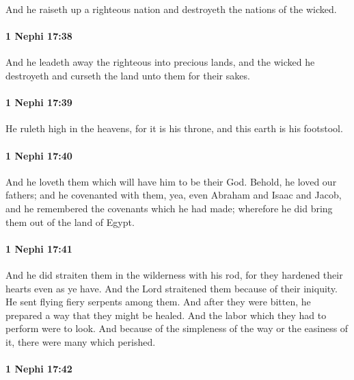 			And he raiseth up a righteous nation and destroyeth the nations of the wicked.

		\paragraph{1 Nephi 17:38} %
			\label{1NEPHI-17-38}

			And he leadeth away the righteous into precious lands,
			and the wicked he destroyeth and curseth the land unto them for their sakes.

		\paragraph{1 Nephi 17:39} %
			\label{1NEPHI-17-39}

			He ruleth high in the heavens,
			for it is his throne,
			and this earth is his footstool.

		\paragraph{1 Nephi 17:40} %
			\label{1NEPHI-17-40}

			And he loveth them which will have him to be their God.
			Behold, he loved our fathers;
			and he covenanted with them,
			yea, even Abraham and Isaac and Jacob,
			and he remembered the covenants which he had made;
			wherefore he did bring them out of the land of Egypt.

		\paragraph{1 Nephi 17:41} %
			\label{1NEPHI-17-41}

			And he did straiten them in the wilderness with his rod,
			for they hardened their hearts even as ye have.
			And the Lord straitened them because of their iniquity.
			He sent flying fiery serpents among them.
			And after they were bitten,
			he prepared a way that they might be healed.
			And the labor which they had to perform were to look.
			And because of the simpleness of the way or the easiness of it,
			there were many which perished.

		\paragraph{1 Nephi 17:42} %
			\label{1NEPHI-17-42}

